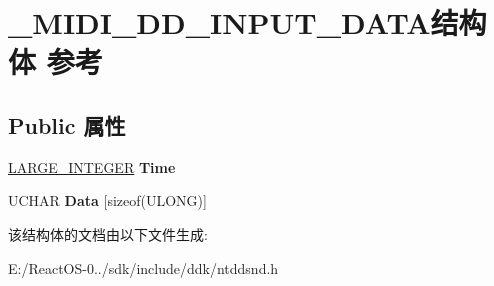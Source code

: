 \hypertarget{struct___m_i_d_i___d_d___i_n_p_u_t___d_a_t_a}{}\section{\+\_\+\+M\+I\+D\+I\+\_\+\+D\+D\+\_\+\+I\+N\+P\+U\+T\+\_\+\+D\+A\+T\+A结构体 参考}
\label{struct___m_i_d_i___d_d___i_n_p_u_t___d_a_t_a}
\subsection*{Public 属性}
\begin{DoxyCompactItemize}
\item 
\mbox{\label{struct___m_i_d_i___d_d___i_n_p_u_t___d_a_t_a_afd4b924d3b3087ea41b30b16e959189d}} 
\hyperlink{union___l_a_r_g_e___i_n_t_e_g_e_r}{L\+A\+R\+G\+E\+\_\+\+I\+N\+T\+E\+G\+ER} {\bfseries Time}
\item 
\mbox{\label{struct___m_i_d_i___d_d___i_n_p_u_t___d_a_t_a_af3f02966d0a5319edf4cb06d3236e1d9}} 
U\+C\+H\+AR {\bfseries Data} \mbox{[}sizeof(U\+L\+O\+NG)\mbox{]}
\end{DoxyCompactItemize}


该结构体的文档由以下文件生成\+:\begin{DoxyCompactItemize}
\item 
E\+:/\+React\+O\+S-\/0../sdk/include/ddk/ntddsnd.\+h\end{DoxyCompactItemize}
